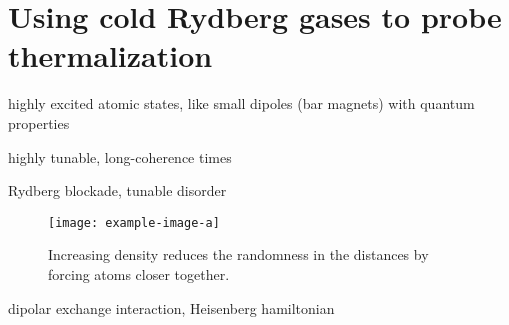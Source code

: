 \section{Using cold Rydberg gases to probe thermalization}
highly excited atomic states, like small dipoles  (bar magnets) with quantum properties

highly tunable, long-coherence times

Rydberg blockade, tunable disorder

\begin{figure}[htb]
	\centering
	\texttt{[image: example-image-a]}
	\caption{Increasing density reduces the randomness in the distances by forcing atoms closer together.}
\end{figure}

dipolar exchange interaction, Heisenberg hamiltonian